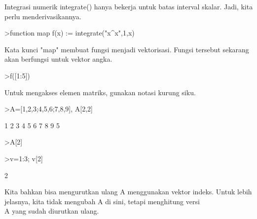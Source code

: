 \documentclass[a4paper,10pt]{article}
\begin{document}
\begin{eulernotebook}
\begin{eulercomment}
\begin{eulercomment}
\begin{eulercomment}
\begin{eulercomment}
\begin{eulercomment}
\begin{eulercomment}
\begin{eulercomment}
\begin{eulercomment}
\begin{eulercomment}
\begin{eulercomment}
\begin{eulercomment}
\begin{eulercomment}
\begin{eulercomment}
\begin{eulercomment}
\begin{eulercomment}
\begin{eulercomment}
\begin{eulercomment}
\begin{eulercomment}
\begin{eulercomment}
\begin{eulercomment}
\begin{eulercomment}
Integrasi numerik integrate() hanya bekerja untuk batas interval
skalar. Jadi, kita perlu menderivasikannya.
\end{eulercomment}
\begin{eulerprompt}
>function map f(x) := integrate("x^x",1,x)
\end{eulerprompt}
\begin{eulercomment}
Kata kunci "map" membuat fungsi menjadi vektorisasi. Fungsi tersebut
sekarang akan berfungsi untuk vektor angka.
\end{eulercomment}
\begin{eulerprompt}
>f([1:5])
\end{eulerprompt}
\begin{euleroutput}
  [0,  2.05045,  13.7251,  113.336,  1241.03]
\end{euleroutput}
\begin{eulercomment}
\begin{eulercomment}
\begin{eulercomment}
Untuk mengakses elemen matriks, gunakan notasi kurung siku.
\end{eulercomment}
\begin{eulerprompt}
>A=[1,2,3;4,5,6;7,8,9], A[2,2]
\end{eulerprompt}
\begin{euleroutput}
              1             2             3 
              4             5             6 
              7             8             9 
  5
\end{euleroutput}
\begin{eulerprompt}
>A[2]
\end{eulerprompt}
\begin{euleroutput}
  [4,  5,  6]
\end{euleroutput}
\begin{eulerprompt}
>v=1:3; v[2]
\end{eulerprompt}
\begin{euleroutput}
  2
\end{euleroutput}
\begin{eulercomment}
Kita bahkan bisa mengurutkan ulang A menggunakan vektor indeks. Untuk
lebih jelasnya, kita tidak mengubah A di sini, tetapi menghitung versi\\
A yang sudah diurutkan ulang.
\end{eulercomment}

\end{eulercomment}
\end{eulercomment}
\end{eulercomment}
\end{eulercomment}
\end{eulercomment}
\end{eulercomment}
\end{eulercomment}
\end{eulercomment}
\end{eulercomment}
\end{eulercomment}
\end{eulercomment}
\end{eulercomment}
\end{eulercomment}
\end{eulercomment}
\end{eulercomment}
\end{eulercomment}
\end{eulercomment}
\end{eulercomment}
\end{eulercomment}
\end{eulercomment}
\end{eulercomment}
\end{eulercomment}
\end{eulernotebook}
\end{document}
